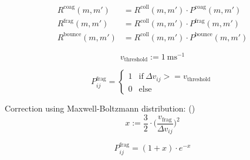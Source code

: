          \\
         \\

        \begin{align}
            R^\text{coag}(m,m')   &= R^\text{coll}(m,m') \cdot P^\text{coag}(m,m') \\
            R^\text{frag}(m,m')   &= R^\text{coll}(m,m') \cdot P^\text{frag}(m,m') \\
            R^\text{bounce}(m,m') &= R^\text{coll}(m,m') \cdot P^\text{bounce}(m,m')
        \end{align}


        

        \clearpage

        \begin{equation}
            v_\text{threshold}:=\SI{1}{\meter\second^{-1}}
        \end{equation}

        \begin{equation}
            P^\text{frag}_{ij}
            =
            \begin{cases}
                1 & \text{if}\ \Delta v_{ij} >= v_\text{threshold}\\
                0 & \text{else}
            \end{cases}
        \end{equation}
        
        Correction using Maxwell-Boltzmann distribution: 
        (\cite{stammler_birnstiel_2022})
        \begin{equation}
            x:=\frac{3}{2}\cdot\bigg(
                \frac{v_\text{frag}}{\Delta v_{ij}}
            \bigg)^2
        \end{equation}
        
        \begin{equation}
            P^\text{frag}_{ij}=(1+x)\cdot e^{-x}
        \end{equation}

        

